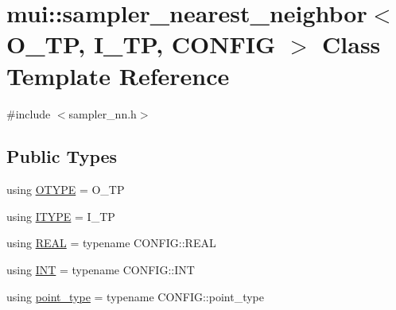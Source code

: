 \hypertarget{classmui_1_1sampler__nearest__neighbor}{}\section{mui\+:\+:sampler\+\_\+nearest\+\_\+neighbor$<$ O\+\_\+\+TP, I\+\_\+\+TP, C\+O\+N\+F\+IG $>$ Class Template Reference}
\label{classmui_1_1sampler__nearest__neighbor}


{\ttfamily \#include $<$sampler\+\_\+nn.\+h$>$}

\subsection*{Public Types}
\begin{DoxyCompactItemize}
\item 
using \hyperlink{classmui_1_1sampler__nearest__neighbor_a20f17bd1227ef27fd3e7658b773547ff}{O\+T\+Y\+PE} = O\+\_\+\+TP
\item 
using \hyperlink{classmui_1_1sampler__nearest__neighbor_aa36c4aae91219490c854650da1b1e674}{I\+T\+Y\+PE} = I\+\_\+\+TP
\item 
using \hyperlink{classmui_1_1sampler__nearest__neighbor_ab3c299b171cbfaba19246f02644c062a}{R\+E\+AL} = typename C\+O\+N\+F\+I\+G\+::\+R\+E\+AL
\item 
using \hyperlink{classmui_1_1sampler__nearest__neighbor_a487918730d940968d94716a0f8badd85}{I\+NT} = typename C\+O\+N\+F\+I\+G\+::\+I\+NT
\item 
using \hyperlink{classmui_1_1sampler__nearest__neighbor_ace9bf5dd74eb5ff63c05941c5cf2a825}{point\+\_\+type} = typename C\+O\+N\+F\+I\+G\+::point\+\_\+type
\end{DoxyCompactItemize}
